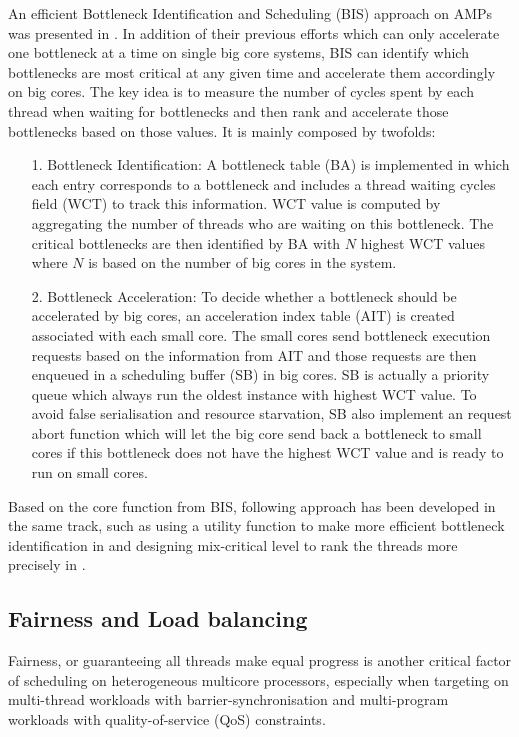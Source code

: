 \documentclass[pageno]{jpaper}
\begin{document}
An efficient Bottleneck Identification and Scheduling (BIS) approach on AMPs was presented in \cite{joao2012bottleneck}. In addition of their previous efforts \cite{suleman2009accelerating} which can only accelerate one bottleneck at a time on single big core systems, BIS can identify which bottlenecks are most critical at any given time and accelerate them accordingly on big cores. The key idea is to measure the number of cycles spent by each thread when waiting for bottlenecks and then rank and accelerate those bottlenecks based on those values. It is mainly composed by twofolds:

\begin{itemize}
\item[1.] Bottleneck Identification: A bottleneck table (BA) is implemented in which each entry corresponds to a bottleneck and includes a thread waiting cycles field (WCT) to track this information. WCT value is computed by aggregating the number of threads who are waiting on this bottleneck. The critical bottlenecks are then identified by BA with $N$ highest WCT values where $N$ is based on the number of big cores in the system.
\item[2.] Bottleneck Acceleration: To decide whether a bottleneck should be accelerated by big cores, an acceleration index table (AIT) is created associated with each small core. The small cores send bottleneck execution requests based on the information from AIT and those requests are then enqueued in a scheduling buffer (SB) in big cores. SB is actually a priority queue which always run the oldest instance with highest WCT value. To avoid false serialisation and resource starvation, SB also implement an request abort function which will let the big core send back a bottleneck to small cores if this bottleneck does not have the highest WCT value and is ready to run on small cores.
\end{itemize}
Based on the core function from BIS, following approach has been developed in the same track, such as using a utility function to make more efficient bottleneck identification in \cite{joao2013utility} and designing mix-critical level to rank the threads more precisely in \cite{han2018multicore}. 


\subsection{Fairness and Load balancing}
Fairness, or guaranteeing all threads make equal progress is another critical factor of scheduling on heterogeneous multicore processors, especially when targeting on multi-thread workloads with barrier-synchronisation and multi-program workloads with quality-of-service (QoS) constraints.
\end{document}
